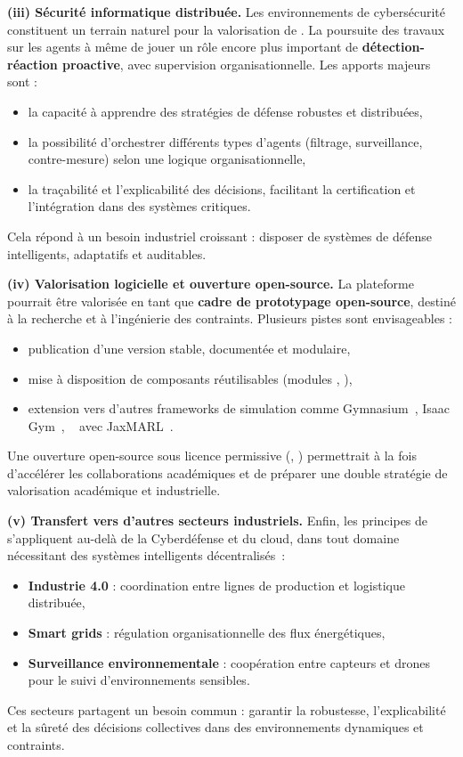 \medskip
\noindent
\textbf{(iii) Sécurité informatique distribuée.}
Les environnements de cybersécurité constituent un terrain naturel pour la valorisation de .
La poursuite des travaux sur les agents  à même de jouer un rôle encore plus important de \textbf{détection-réaction proactive}, avec supervision organisationnelle.
Les apports majeurs sont :
\begin{itemize}
  \item la capacité à apprendre des stratégies de défense robustes et distribuées,
  \item la possibilité d'orchestrer différents types d'agents (filtrage, surveillance, contre-mesure) selon une logique organisationnelle,
  \item la traçabilité et l'explicabilité des décisions, facilitant la certification et l'intégration dans des systèmes critiques.
\end{itemize}
Cela répond à un besoin industriel croissant : disposer de systèmes de défense intelligents, adaptatifs et auditables.

\medskip
\noindent
\textbf{(iv) Valorisation logicielle et ouverture open-source.}
La plateforme  pourrait être valorisée en tant que \textbf{cadre de prototypage open-source}, destiné à la recherche et à l'ingénierie des  contraints.
Plusieurs pistes sont envisageables :
\begin{itemize}
  \item publication d'une version stable, documentée et modulaire,
  \item mise à disposition de composants réutilisables (modules , ),
  \item extension vers d'autres frameworks de simulation comme Gymnasium~\cite{kwiatkowski2024}, Isaac Gym~\cite{Makoviychuk2021}, ~\cite{Frostig2019} avec JaxMARL~\cite{Rutherford2024}.
\end{itemize}
Une ouverture open-source sous licence permissive (, ) permettrait à la fois d'accélérer les collaborations académiques et de préparer une double stratégie de valorisation académique et industrielle.

\medskip
\noindent
\textbf{(v) Transfert vers d'autres secteurs industriels.}
Enfin, les principes de  s'appliquent au-delà de la Cyberdéfense et du cloud, dans tout domaine nécessitant des systèmes intelligents décentralisés~:
\begin{itemize}
  \item \textbf{Industrie 4.0} : coordination entre lignes de production et logistique distribuée,
  \item \textbf{Smart grids} : régulation organisationnelle des flux énergétiques,
  \item \textbf{Surveillance environnementale} : coopération entre capteurs et drones pour le suivi d'environnements sensibles.
\end{itemize}
Ces secteurs partagent un besoin commun : garantir la robustesse, l'explicabilité et la sûreté des décisions collectives dans des environnements dynamiques et contraints.

